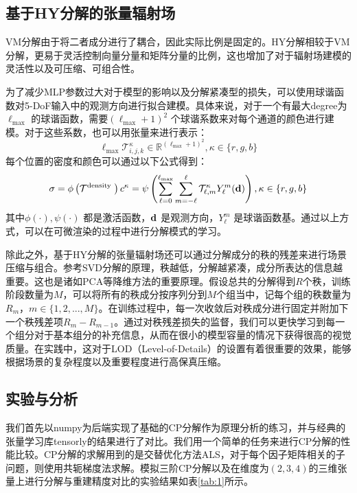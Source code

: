 \documentclass[10pt,twocolumn,letterpaper]{article}
\begin{document}
\subsection{基于HY分解的张量辐射场}

VM分解由于将二者成分进行了耦合，因此实际比例是固定的。HY分解相较于VM分解，更易于灵活控制向量分量和矩阵分量的比例，这也增加了对于辐射场建模的灵活性以及可压缩、可组合性。

为了减少MLP参数过大对于模型的影响以及分解紧凑型的损失，可以使用球谐函数对5-DoF输入中的观测方向进行拟合建模。具体来说，对于一个有最大degree为$\ell_{\max}$ 的球谐函数，需要$(\ell_{\max}+1)^2$ 个球谐系数来对每个通道的颜色进行建模。对于这些系数，也可以用张量来进行表示：
\begin{equation}
  \ell_{\max }\mathcal{T}_{i, j, k}^{\kappa} \in \mathbb{R}^{\left(\ell_{\max }+1\right)^{2}}, \kappa \in\{r, g, b\}
\end{equation}
\label{eq:11}
每个位置的密度和颜色可以通过以下公式得到：
\begin{equation}
  \sigma=\phi\left(\mathcal{T}^{\text {density }}\right) \\ c^{\kappa}=\psi\left(\sum_{\ell=0}^{\ell_{\max }} \sum_{m=-\ell}^{\ell} \mathcal{T}_{\ell, m}^{\kappa} Y_{\ell}^{m}(\mathbf{d})\right), \kappa \in\{r, g, b\}
\end{equation}
\label{eq:12}
其中$\phi(\cdot),\psi(\cdot)$ 都是激活函数，$\bold d$ 是观测方向，$Y^m_{\ell}$ 是球谐函数基。通过以上方式，可以在可微渲染的过程中进行分解模式的学习。

除此之外，基于HY分解的张量辐射场还可以通过分解成分的秩的残差来进行场景压缩与组合。参考SVD分解的原理，秩越低，分解越紧凑，成分所表达的信息越重要。这也是诸如PCA等降维方法的重要原理。假设总共的分解得到$R$个秩，训练阶段数量为$M$，可以将所有的秩成分按序列分到$M$个组当中，记每个组的秩数量为$R_m$，$m\in\{1,2,...,M\}$。在训练过程中，每一次收敛后对秩成分进行固定并附加下一个秩残差项$R_m-R_{m-1}$。通过对秩残差损失的监督，我们可以更快学习到每一个组分对于基本组分的补充信息，从而在很小的模型容量的情况下获得很高的视觉质量。在实践中，这对于LOD（Level-of-Details）的设置有着很重要的效果，能够根据场景的复杂程度以及重要程度进行高保真压缩。

\subsection{实验与分析}
我们首先以numpy为后端实现了基础的CP分解作为原理分析的练习，并与经典的张量学习库tensorly的结果进行了对比。我们用一个简单的任务来进行CP分解的性能比较。CP分解的求解用到的是交替优化方法ALS，对于每个因子矩阵相关的子问题，则使用共轭梯度法求解。模拟三阶CP分解以及在维度为$(2,3,4)$的三维张量上进行分解与重建精度对比的实验结果如表\ref{tab:1}所示。
\end{document}
